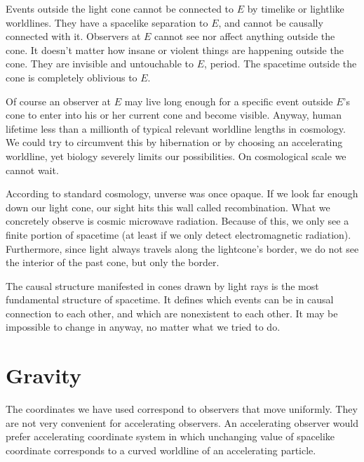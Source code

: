 \documentclass[11pt,oneside%
]{memoir}
\begin{document}
Events outside the light cone cannot be connected to \(E\) by timelike or lightlike worldlines. They have a spacelike separation to \(E\), and cannot be causally connected with it. Observers at \(E\) cannot see nor affect anything outside the cone. It doesn't matter how insane or violent things are happening outside the cone. They are invisible and untouchable to \(E\), period. The spacetime outside the cone is completely oblivious to \(E\). 

Of course an observer at \(E\) may live long enough for a specific event outside \(E\)'s cone to enter into his or her current cone and become visible. Anyway, human lifetime less than a millionth of typical relevant worldline lengths in cosmology. We could try to circumvent this by hibernation or by choosing an accelerating worldline, yet biology severely limits our possibilities. On cosmological scale we cannot wait.

According to standard cosmology, unverse was once opaque. If we look far enough down our light cone, our sight hits this wall called recombination. What we concretely observe is cosmic microwave radiation. Because of this, we only see a finite portion of spacetime (at least if we only detect electromagnetic radiation). Furthermore, since light always travels along the lightcone's border, we do not see the interior of the past cone, but only the border.


The causal structure manifested in cones drawn by light rays is the most fundamental structure of spacetime. It defines which events can be in causal connection to each other, and which are nonexistent to each other. It may be impossible to change in anyway, no matter what we tried to do.


\chapter{Gravity}

The coordinates we have used correspond to observers that move uniformly. They are not very convenient for accelerating observers. An accelerating observer would prefer accelerating coordinate system in which unchanging value of spacelike coordinate corresponds to a curved worldline of an accelerating particle.
\end{document}
